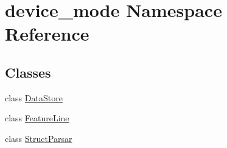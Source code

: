 \hypertarget{namespacedevice__mode}{}\section{device\+\_\+mode Namespace Reference}
\label{namespacedevice__mode}
\subsection*{Classes}
\begin{DoxyCompactItemize}
\item 
class \hyperlink{classdevice__mode_1_1DataStore}{Data\+Store}
\item 
class \hyperlink{classdevice__mode_1_1FeatureLine}{Feature\+Line}
\item 
class \hyperlink{classdevice__mode_1_1StructParsar}{Struct\+Parsar}
\end{DoxyCompactItemize}
